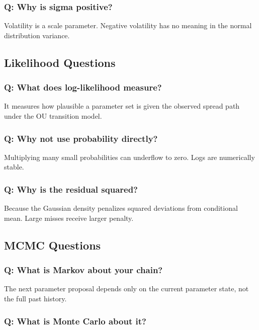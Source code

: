 \documentclass[11pt]{article}
\begin{document}
\subsubsection{Q: Why is sigma positive?}

Volatility is a scale parameter. Negative volatility has no meaning in the
normal distribution variance.

\subsection{Likelihood Questions}

\subsubsection{Q: What does log-likelihood measure?}

It measures how plausible a parameter set is given the observed spread path
under the OU transition model.

\subsubsection{Q: Why not use probability directly?}

Multiplying many small probabilities can underflow to zero. Logs are numerically
stable.

\subsubsection{Q: Why is the residual squared?}

Because the Gaussian density penalizes squared deviations from conditional mean.
Large misses receive larger penalty.

\subsection{MCMC Questions}

\subsubsection{Q: What is Markov about your chain?}

The next parameter proposal depends only on the current parameter state, not the
full past history.

\subsubsection{Q: What is Monte Carlo about it?}
\end{document}
